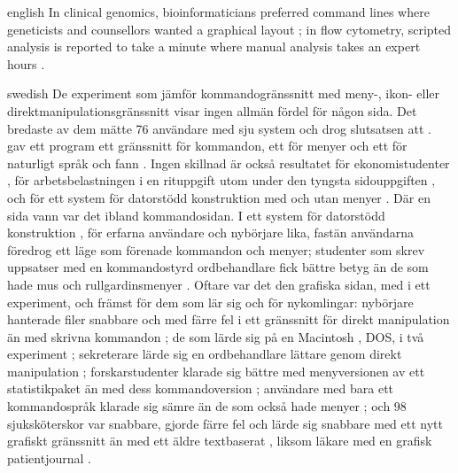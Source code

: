 \begin{onlyin}{english}
In clinical genomics, bioinformaticians preferred command lines where
geneticists and counsellors wanted a graphical layout
\autocite{Shyr2015Dynamic}; in flow cytometry, scripted analysis is
reported to take a minute where manual analysis takes an expert hours
\autocite{Brinkman2019Improving}.
\end{onlyin}
\begin{onlyin}{swedish}
De experiment som jämför kommandogränssnitt med meny-, ikon- eller
direktmanipulationsgränssnitt visar ingen allmän fördel för någon sida.
Det bredaste av dem mätte 76 användare med sju system och drog
slutsatsen att .  \Textcite{Hauptmann1983Comparison} gav ett program ett
gränssnitt för kommandon, ett för menyer och ett för naturligt språk
och fann
.  Ingen skillnad är också resultatet för ekonomistudenter
\autocite{Lindner1998Command}, för arbetsbelastningen i en rituppgift
utom under den tyngsta sidouppgiften \autocite{Eberleh1992Thinking}, och
för ett system för datorstödd konstruktion med och utan menyer
\autocite{Roy1992Evaluation}.  Där en sida vann var det ibland
kommandosidan.  I ett system för datorstödd konstruktion
, för erfarna
användare och nybörjare lika, fastän användarna föredrog ett läge som
förenade kommandon och menyer; studenter som skrev uppsatser med en
kommandostyrd ordbehandlare fick bättre betyg än de som hade mus och
rullgardinsmenyer \autocite{Mahach1995Effects}.  Oftare var det den
grafiska sidan, med
 i ett experiment, och främst för dem som lär sig och för
nykomlingar: nybörjare hanterade filer snabbare och med färre fel i ett
gränssnitt för direkt manipulation än med skrivna kommandon
\autocite{Margono1995Study}; de som lärde sig på en Macintosh
, DOS, i två
experiment \autocite{Davis1992Experimental}; sekreterare lärde sig en
ordbehandlare lättare genom direkt manipulation
\autocite{Jordan1992Claims}; forskarstudenter klarade sig bättre med
menyversionen av ett statistikpaket än med dess kommandoversion
\autocite{Schultz1998Effects}; användare med bara ett kommandospråk
klarade sig sämre än de som också hade menyer
\autocite{Taylor1987Experimental}; och 98 sjuksköterskor var snabbare,
gjorde färre fel och lärde sig snabbare med ett nytt grafiskt gränssnitt
än med ett äldre textbaserat \autocite{Staggers2000Comparing}, liksom
läkare med en grafisk patientjournal \autocite{Rodriguez2002Study}.


\end{onlyin}
